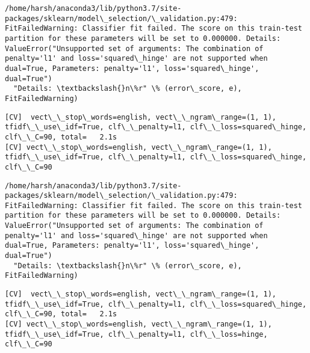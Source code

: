 \documentclass[11pt]{article}
\begin{document}
    \begin{Verbatim}[commandchars=\\\{\}]
/home/harsh/anaconda3/lib/python3.7/site-packages/sklearn/model\_selection/\_validation.py:479: FitFailedWarning: Classifier fit failed. The score on this train-test partition for these parameters will be set to 0.000000. Details: 
ValueError("Unsupported set of arguments: The combination of penalty='l1' and loss='squared\_hinge' are not supported when dual=True, Parameters: penalty='l1', loss='squared\_hinge', dual=True")
  "Details: \textbackslash{}n\%r" \% (error\_score, e), FitFailedWarning)

    \end{Verbatim}

    \begin{Verbatim}[commandchars=\\\{\}]
[CV]  vect\_\_stop\_words=english, vect\_\_ngram\_range=(1, 1), tfidf\_\_use\_idf=True, clf\_\_penalty=l1, clf\_\_loss=squared\_hinge, clf\_\_C=90, total=   2.1s
[CV] vect\_\_stop\_words=english, vect\_\_ngram\_range=(1, 1), tfidf\_\_use\_idf=True, clf\_\_penalty=l1, clf\_\_loss=squared\_hinge, clf\_\_C=90 

    \end{Verbatim}

    \begin{Verbatim}[commandchars=\\\{\}]
/home/harsh/anaconda3/lib/python3.7/site-packages/sklearn/model\_selection/\_validation.py:479: FitFailedWarning: Classifier fit failed. The score on this train-test partition for these parameters will be set to 0.000000. Details: 
ValueError("Unsupported set of arguments: The combination of penalty='l1' and loss='squared\_hinge' are not supported when dual=True, Parameters: penalty='l1', loss='squared\_hinge', dual=True")
  "Details: \textbackslash{}n\%r" \% (error\_score, e), FitFailedWarning)

    \end{Verbatim}

    \begin{Verbatim}[commandchars=\\\{\}]
[CV]  vect\_\_stop\_words=english, vect\_\_ngram\_range=(1, 1), tfidf\_\_use\_idf=True, clf\_\_penalty=l1, clf\_\_loss=squared\_hinge, clf\_\_C=90, total=   2.1s
[CV] vect\_\_stop\_words=english, vect\_\_ngram\_range=(1, 1), tfidf\_\_use\_idf=True, clf\_\_penalty=l1, clf\_\_loss=hinge, clf\_\_C=90 

    \end{Verbatim}
\end{document}
